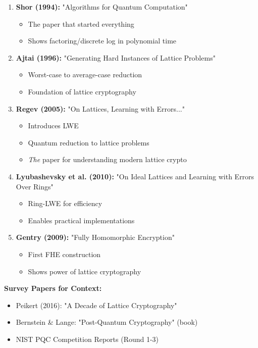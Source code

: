 \documentclass[11pt,a4paper]{article}
\begin{document}
\begin{enumerate}
    \item \textbf{Shor (1994):} "Algorithms for Quantum Computation"
    \begin{itemize}
        \item The paper that started everything
        \item Shows factoring/discrete log in polynomial time
    \end{itemize}
    
    \item \textbf{Ajtai (1996):} "Generating Hard Instances of Lattice Problems"
    \begin{itemize}
        \item Worst-case to average-case reduction
        \item Foundation of lattice cryptography
    \end{itemize}
    
    \item \textbf{Regev (2005):} "On Lattices, Learning with Errors..."
    \begin{itemize}
        \item Introduces LWE
        \item Quantum reduction to lattice problems
        \item \textit{The} paper for understanding modern lattice crypto
    \end{itemize}
    
    \item \textbf{Lyubashevsky et al. (2010):} "On Ideal Lattices and Learning with Errors Over Rings"
    \begin{itemize}
        \item Ring-LWE for efficiency
        \item Enables practical implementations
    \end{itemize}
    
    \item \textbf{Gentry (2009):} "Fully Homomorphic Encryption"
    \begin{itemize}
        \item First FHE construction
        \item Shows power of lattice cryptography
    \end{itemize}
\end{enumerate}

\textbf{Survey Papers for Context:}
\begin{itemize}
    \item Peikert (2016): "A Decade of Lattice Cryptography"
    \item Bernstein \& Lange: "Post-Quantum Cryptography" (book)
    \item NIST PQC Competition Reports (Round 1-3)
\end{itemize}
\end{document}
